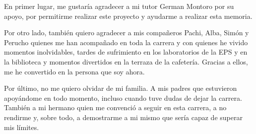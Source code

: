 En primer lugar, me gustaría agradecer a mi tutor German Montoro por su apoyo, por permitirme realizar este proyecto y ayudarme a realizar esta memoria.

Por otro lado, también quiero agradecer a mis compañeros Pachi, Alba, Simón y Perucho quienes me han acompañado en toda la carrera y con quienes he vivido momentos inolvidables, tardes de sufrimiento en los laboratorios de la EPS y en la biblioteca y momentos divertidos en la terraza de la cafetería. Gracias a ellos, me he convertido en la persona que soy ahora. 

Por último, no me quiero olvidar de mi familia. A mis padres que estuvieron apoyándome en todo momento, incluso cuando tuve dudas de dejar la carrera. También a mi hermano quien me convenció a seguir en esta carrera, a no rendirme y, sobre todo, a demostrarme a mi mismo que sería capaz de superar mis límites.